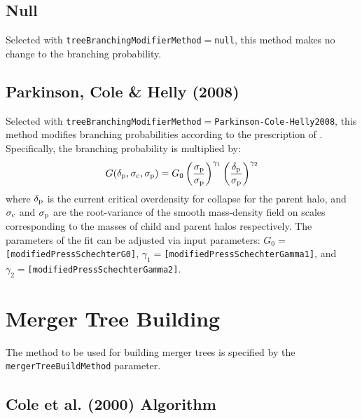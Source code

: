 \subsection{Null}

Selected with {\tt treeBranchingModifierMethod}$=${\tt null}, this method makes no change to the branching probability.

\subsection{Parkinson, Cole \& Helly (2008)}

Selected with {\tt treeBranchingModifierMethod}$=${\tt Parkinson-Cole-Helly2008}, this method modifies branching probabilities according to the prescription of \cite{parkinson_generating_2008}. Specifically, the branching probability is multiplied by:
\begin{equation}
 G(\delta_{\rm p},\sigma_{\rm c},\sigma_{\rm p}) = G_0 \left({\sigma_{\rm p}\over\sigma_{\rm p}}\right)^{\gamma_1} \left({\delta_{\rm p}\over\sigma_{\rm p}}\right)^{\gamma_2}
\end{equation}
where $\delta_{\rm p}$ is the current critical overdensity for collapse for the parent halo, and $\sigma_{\rm c}$ and $\sigma_{\rm p}$ are the root-variance of the smooth mass-density field on scales corresponding to the masses of child and parent halos respectively. The parameters of the fit can be adjusted via input parameters: $G_0=${\tt [modifiedPressSchechterG0]}, $\gamma_1=${\tt [modifiedPressSchechterGamma1]}, and $\gamma_2=${\tt [modifiedPressSchechterGamma2]}.

\section{Merger Tree Building}

The method to be used for building merger trees is specified by the {\tt mergerTreeBuildMethod} parameter.

\subsection{Cole et al. (2000) Algorithm}

